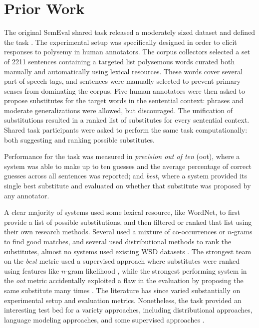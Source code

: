 \section{Prior Work}

The original SemEval shared task released a moderately sized dataset and
defined the task \cite{mccarthy:2007:semeval}. The experimental setup was
specifically designed in order to elicit responses to polysemy in human
annotators. The corpus collectors selected a set of 2211 sentences containing
a targeted list polysemous words curated both manually and automatically using
lexical resources. These words cover several part-of-speech tags, and sentences
were manually selected to prevent primary senses from dominating the corpus.
Five human annotators were then asked to propose substitutes for the target
words in the sentential context: phrases and moderate generalizations were
allowed, but discouraged. The unification of substitutions resulted in a ranked
list of substitutes for every sentential context. Shared task participants
were asked to perform the same task computationally: both suggesting and
ranking possible substitutes.

Performance for the task was measured in {\em precision out of ten} (oot),
where a system was able to make up to ten guesses and the average percentage
of correct guesses across all sentences was reported; and {\em best}, where
a system provided its single best substitute and evaluated on whether that
substitute was proposed by any annotator.

A clear majority of systems used some lexical resource, like WordNet, to first
provide a list of possible substitutions, and then filtered or ranked that list
using their own research methods. Several used a mixture of co-occurrences or
$n$-grams to find good matches, and several used distributional methods to rank
the substitutes, almost no systems used existing WSD datasets
\cite{mccarthy:2007:semeval}. The strongest team on the {\em best} metric used a
supervised approach where substitutes were ranked
using features like $n$-gram likelihood \cite{yuret:2007:semeval}, while
the strongest performing system in the {\em oot} metric accidentally exploited
a flaw in the evaluation by proposing the same substitute many times
\cite{giuliano:2007:semeval}. The
literature has since varied substantially on experimental setup and evaluation
metrics. Nonetheless, the task provided an interesting test bed for a
variety approaches, including distributional approaches, language modeling
approaches, and some supervised approaches \cite{szarvas:2013:naacl}.

